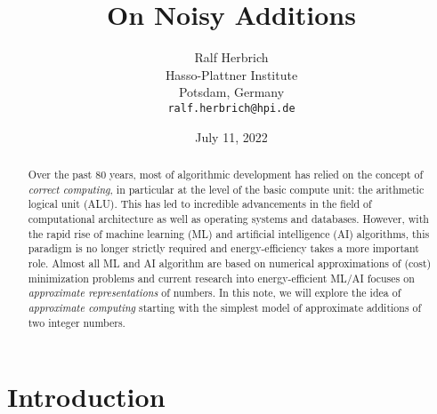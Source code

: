 \documentclass{article}
\title{On Noisy Additions}
\date{July 11, 2022}		%
\author{Ralf Herbrich \\
	Hasso-Plattner Institute\\
	Potsdam, Germany \\
	\texttt{ralf.herbrich@hpi.de} \\
}
\newcommand{\0}{\boldsymbol{0}}
\newcommand{\1}{\boldsymbol{1}}
\begin{document}
\maketitle

\begin{abstract}
	Over the past 80 years, most of algorithmic development has relied on the concept of {\em correct computing}, in particular at the level of the basic compute unit: the arithmetic logical unit (ALU). This has led to incredible advancements in the field of computational architecture as well as operating systems and databases. However, with the rapid rise of machine learning (ML) and artificial intelligence (AI) algorithms, this paradigm is no longer strictly required and energy-efficiency takes a more important role. Almost all ML and AI algorithm are based on numerical approximations of (cost) minimization problems and current research into energy-efficient ML/AI focuses on {\em approximate representations} of numbers. In this note, we will explore the idea of {\em approximate computing} starting with the simplest model of approximate additions of two integer numbers.
\end{abstract}




\section{Introduction}
\lipsum[1]




 
\end{document}
